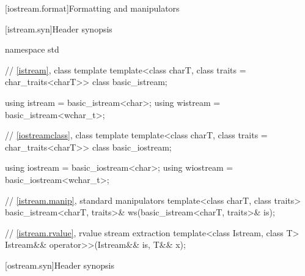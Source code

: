 [iostream.format]{Formatting and manipulators}

[istream.syn]{Header  synopsis}

%
\begin{codeblock}
namespace std {
  // \ref{istream}, class template 
  template<class charT, class traits = char_traits<charT>>
    class basic_istream;

  using istream  = basic_istream<char>;
  using wistream = basic_istream<wchar_t>;

  // \ref{iostreamclass}, class template 
  template<class charT, class traits = char_traits<charT>>
    class basic_iostream;

  using iostream  = basic_iostream<char>;
  using wiostream = basic_iostream<wchar_t>;

  // \ref{istream.manip}, standard  manipulators
  template<class charT, class traits>
    basic_istream<charT, traits>& ws(basic_istream<charT, traits>& is);

  // \ref{istream.rvalue}, rvalue stream extraction
  template<class Istream, class T>
    Istream&& operator>>(Istream&& is, T&& x);
}
\end{codeblock}

%
%
%
%

[ostream.syn]{Header  synopsis}

